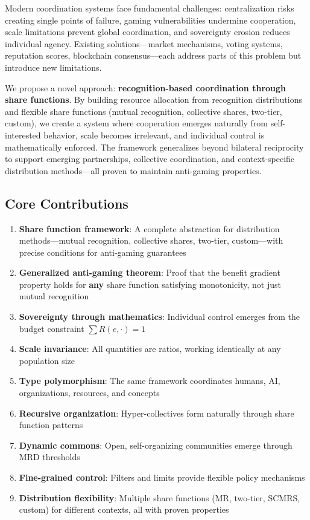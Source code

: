 \documentclass[11pt,a4paper]{article}
\theoremstyle{definition}
\theoremstyle{remark}
\begin{document}
Modern coordination systems face fundamental challenges: centralization risks creating single points of failure, gaming vulnerabilities undermine cooperation, scale limitations prevent global coordination, and sovereignty erosion reduces individual agency. Existing solutions---market mechanisms, voting systems, reputation scores, blockchain consensus---each address parts of this problem but introduce new limitations.

We propose a novel approach: \textbf{recognition-based coordination through share functions}. By building resource allocation from recognition distributions and flexible share functions (mutual recognition, collective shares, two-tier, custom), we create a system where cooperation emerges naturally from self-interested behavior, scale becomes irrelevant, and individual control is mathematically enforced. The framework generalizes beyond bilateral reciprocity to support emerging partnerships, collective coordination, and context-specific distribution methods---all proven to maintain anti-gaming properties.

\subsection{Core Contributions}

\begin{enumerate}
\item \textbf{Share function framework}: A complete abstraction for distribution methods---mutual recognition, collective shares, two-tier, custom---with precise conditions for anti-gaming guarantees
\item \textbf{Generalized anti-gaming theorem}: Proof that the benefit gradient property holds for \textbf{any} share function satisfying monotonicity, not just mutual recognition
\item \textbf{Sovereignty through mathematics}: Individual control emerges from the budget constraint $\sum R(e,\cdot)=1$
\item \textbf{Scale invariance}: All quantities are ratios, working identically at any population size
\item \textbf{Type polymorphism}: The same framework coordinates humans, AI, organizations, resources, and concepts
\item \textbf{Recursive organization}: Hyper-collectives form naturally through share function patterns
\item \textbf{Dynamic commons}: Open, self-organizing communities emerge through MRD thresholds
\item \textbf{Fine-grained control}: Filters and limits provide flexible policy mechanisms
\item \textbf{Distribution flexibility}: Multiple share functions (MR, two-tier, SCMRS, custom) for different contexts, all with proven properties
\end{enumerate}
\end{document}
